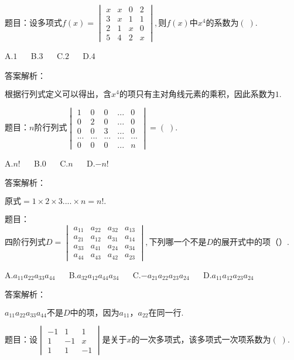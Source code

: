 题目：$\mathrm{设多项式}f(x)=\begin{vmatrix}x&x&0&2\\3&x&1&1\\2&1&x&0\\5&4&2&x\end{vmatrix},则f(x)中x^4\mathrm{的系数为}(\;).$

A.$1$ $\quad$ B.$3$ $\quad$ C.$2$ $\quad$ D.$4$

答案解析：

$\mathrm{根据行列式定义可以得出}，含x^4\mathrm{的项只有主对角线元素的乘积}，\mathrm{因此系数为}1.$



题目：$n\mathrm{阶行列式}\begin{vmatrix}1&0&0&...&0\\0&2&0&...&0\\0&0&3&...&0\\...&...&...&...&...\\0&0&0&...&n\end{vmatrix}=(\;).$

A.$n!$ $\quad$ B.$0$ $\quad$ C.$n$ $\quad$ D.$-n!$

答案解析：

$\mathrm{原式}=1\times2\times3....\times n=n!.$



题目：$\mathrm{四阶行列式}D=\begin{vmatrix}a_{11}&a_{22}&a_{32}&a_{13}\\a_{21}&a_{12}&a_{31}&a_{14}\\a_{33}&a_{41}&a_{24}&a_{34}\\a_{44}&a_{43}&a_{42}&a_{23}\end{vmatrix},\mathrm{下列哪一个不是}D\mathrm{的展开式中的项}（）.$

A.$a_{11}a_{22}a_{33}a_{44}$ $\quad$ B.$a_{32}a_{12}a_{44}a_{34}$ $\quad$ C.$-a_{21}a_{22}a_{23}a_{24}$ $\quad$ D.$a_{11}a_{12}a_{23}a_{24}$

答案解析：

$a_{11}a_{22}a_{33}a_{44}\mathrm{不是}D\mathrm{中的项}，\mathrm{因为}a_{11}，a_{22}\mathrm{在同一行}.$



题目：$设\begin{vmatrix}-1&1&1\\1&-1&x\\1&1&-1\end{vmatrix}\mathrm{是关于}x\mathrm{的一次多项式}，\mathrm{该多项式一次项系数为}(\;).$

